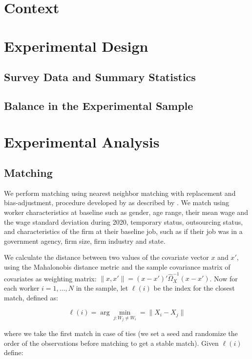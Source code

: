 \documentclass[oneside,11pt]{article}
\begin{document}
\section{Context} \label{context}

\section{Experimental Design} \label{Experiment}

\subsection{Survey Data and Summary Statistics}

\subsection{Balance in the Experimental Sample}

\section{Experimental Analysis} \label{experiment}

\subsection{Matching} \label{matching}
We perform matching using nearest neighbor matching with replacement and bias-adjustment, procedure developed by \cite{abadie2006large} as described by \cite{imbens2015matching}. We match using worker characteristics at baseline such as gender, age range, their mean wage and the wage standard deviation during 2020, temporary status, outsourcing status, and characteristics of the firm at their baseline job, such as if their job was in a government agency, firm size, firm industry and state. 

We calculate the distance between two values of the covariate vector $x$ and $x'$, using the Mahalonobis distance metric and the sample covariance matrix of covariates as weighting matrix: $\lVert x,x' \rVert = (x-x')'\hat{\Omega}^{-1}_{X}(x-x')$. Now for each worker $i = 1, \dots, N$ in the sample, let $\ell(i)$ be the index for the closest match, defined as:

$$\ell(i) = \arg \min_{j:W_j \neq W_i} = \rVert X_i - X_j \lVert$$ 

where we take the first match in case of ties (we set a seed and randomize the order of the observations before matching to get a stable match). Given $\ell(i)$ define:
\end{document}
